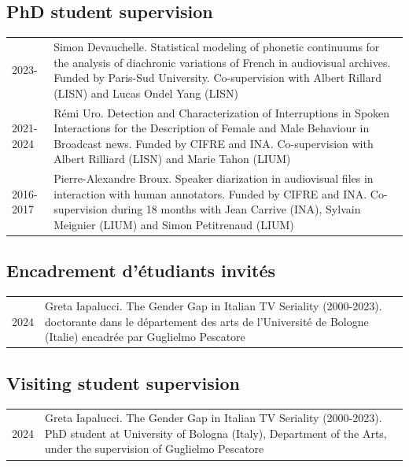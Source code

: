 \begin{en}
\subsection{PhD student supervision}
\begin{tabularx}{\linewidth}{@{}l X@{}}
2023- & Simon Devauchelle. Statistical modeling of phonetic continuums for the analysis of diachronic variations of French in audiovisual archives. Funded by Paris-Sud University. Co-supervision with Albert Rillard (LISN) and Lucas Ondel Yang (LISN)\\
2021-2024 & Rémi Uro. Detection and Characterization of Interruptions in Spoken Interactions for the Description of Female and Male Behaviour in Broadcast news. Funded by CIFRE and INA. Co-supervision with Albert Rilliard (LISN) and Marie Tahon (LIUM)\\
2016-2017 & Pierre-Alexandre Broux. Speaker diarization in audiovisual files in interaction with human annotators. Funded by CIFRE and INA. Co-supervision during 18 months with Jean Carrive (INA), Sylvain Meignier (LIUM) and Simon Petitrenaud (LIUM)\\
\end{tabularx}
\end{en}

\begin{fr}
\subsection{Encadrement d'étudiants invités}
\begin{tabularx}{\linewidth}{@{}l X@{}}
2024 & Greta Iapalucci. The Gender Gap in Italian TV Seriality (2000-2023). doctorante dans le département des arts de l'Université de Bologne (Italie) encadrée par Guglielmo Pescatore\\
\end{tabularx}
\end{fr}

\begin{en}
\subsection{Visiting student supervision}
\begin{tabularx}{\linewidth}{@{}l X@{}}
2024 & Greta Iapalucci. The Gender Gap in Italian TV Seriality (2000-2023). PhD student at University of Bologna (Italy), Department of the Arts, under the supervision of Guglielmo Pescatore\\
\end{tabularx}
\end{en}






